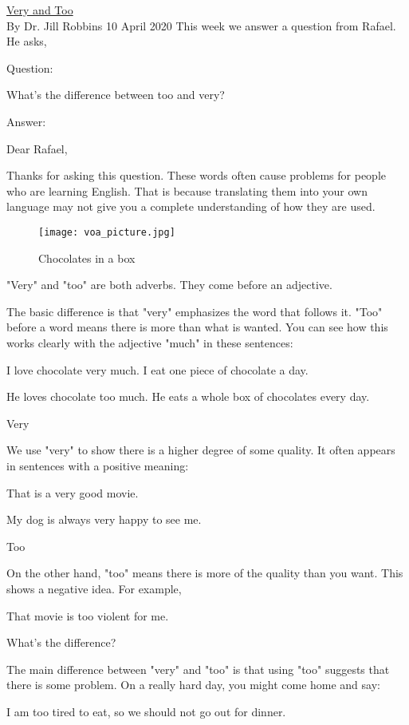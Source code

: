 \href{https://www.51voa.com/VOA_Special_English/very-and-too-84302.html}{Very and Too} \\

By Dr. Jill Robbins
10 April 2020
This week we answer a question from Rafael. He asks,

Question:

What's the difference between too and very?

Answer:

Dear Rafael,

Thanks for asking this question. These words often cause problems for people who are learning English. That is because translating them into your own language may not give you a complete understanding of how they are used.

\begin{figure}[h] %
    \centering
    \texttt{[image: voa\_picture.jpg]}
    \caption{Chocolates in a box}
\end{figure}

"Very" and "too" are both adverbs. They come before an adjective.

The basic difference is that "very" emphasizes the word that follows it. "Too" before a word means there is more than what is wanted. You can see how this works clearly with the adjective "much" in these sentences:

I love chocolate very much. I eat one piece of chocolate a day.

He loves chocolate too much. He eats a whole box of chocolates every day.

Very

We use "very" to show there is a higher degree of some quality. It often appears in sentences with a positive meaning:

That is a very good movie.

My dog is always very happy to see me.

Too

On the other hand, "too" means there is more of the quality than you want. This shows a negative idea. For example,

That movie is too violent for me.

What's the difference?

The main difference between "very" and "too" is that using "too" suggests that there is some problem. On a really hard day, you might come home and say:

I am too tired to eat, so we should not go out for dinner.


